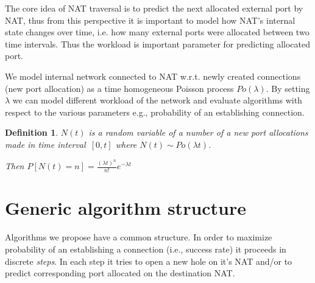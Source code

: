 \documentclass[twoside]{article}
\newtheorem{mydef}{Definition}
\begin{document}
\begin{multicols}{2}
The core idea of NAT traversal is to predict the next allocated external port by NAT, thus from this perspective 
it is important to model how NAT's internal state changes over time, i.e. how many external ports 
were allocated between two time intervals. Thus the workload is important parameter for predicting allocated port.

We model internal network connected to NAT w.r.t. newly created connections (new port allocation) as a 
time homogeneous Poisson process $Po(\lambda)$. By setting $\lambda$ we can model 
different workload of the network and evaluate algorithms with respect to the various parameters e.g., 
probability of an establishing connection. 


\begin{mydef}
$N(t)$ is a random variable of a number of a new port allocations made in time 
interval~$[0,t]$ where $N(t) \sim Po(\lambda t)$. \\ 
                                                      
\begin{center}                                                     
Then $P[N(t)=n] = \frac{(\lambda t)^n}{n!} e^{-\lambda t}$
\end{center}
\end{mydef}

\section{Generic algorithm structure}
Algorithms we propose have a common structure. In order to maximize probability of an establishing
a connection (i.e., success rate) it proceeds in discrete \emph{steps}. In each step it 
tries to open a new hole on it's NAT and/or to predict corresponding port allocated on the destination
NAT.


\end{multicols}
\end{document}
